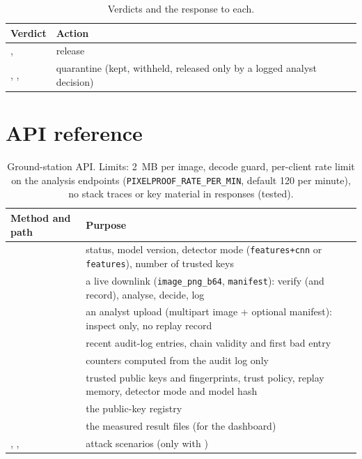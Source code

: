 \begin{table}[!htbp]
\centering\small
\begin{tabularx}{\textwidth}{|L{7.2cm}|Y|}
\hline
\textbf{Verdict} & \textbf{Action}\\
\hline
{},  & release\\
\hline
{}, ,  & quarantine (kept, withheld, released only by a logged analyst decision)\\
\hline
\end{tabularx}
\caption{Verdicts and the response to each.}
\end{table}

\section{API reference}\label{app:api}
\begin{table}[!htbp]
\centering\small
\begin{tabularx}{\textwidth}{|L{6.4cm}|Y|}
\hline
\textbf{Method and path} & \textbf{Purpose}\\
\hline
{} & status, model version, detector mode (\texttt{features+cnn} or \texttt{features}), number of trusted keys\\
\hline
{} & a live downlink (\texttt{image\_png\_b64}, \texttt{manifest}): verify (and record), analyse, decide, log\\
\hline
{} & an analyst upload (multipart image + optional manifest): inspect only, no replay record\\
\hline
{} & recent audit-log entries, chain validity and first bad entry\\
\hline
{} & counters computed from the audit log only\\
\hline
{} & trusted public keys and fingerprints, trust policy, replay memory, detector mode and model hash\\
\hline
{} & the public-key registry\\
\hline
{} & the measured result files (for the dashboard)\\
\hline
{}, ,  & attack scenarios (only with )\\
\hline
\end{tabularx}
\caption{Ground-station API. Limits: 2~MB per image, decode guard, per-client rate limit on the analysis endpoints (\texttt{PIXELPROOF\_RATE\_PER\_MIN}, default 120 per minute), no stack traces or key material in responses (tested).}
\end{table}

